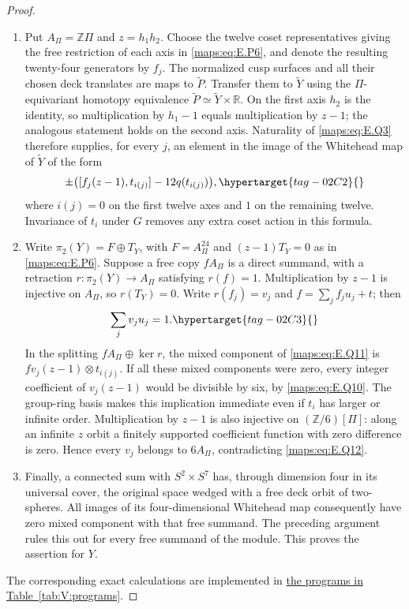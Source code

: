 \documentclass[11pt,a4paper]{article}
\numberwithin{equation}{section}
\theoremstyle{definition}
\begin{document}
\begin{proof}
\begin{enumerate}[label=\arabic*.,leftmargin=*]
\item Put $A_\Pi=\mathbb Z\Pi$ and $z=h_1h_2$.  Choose the twelve
coset representatives giving the free restriction of each
axis in \eqref{maps:eq:E.P6}, and denote the resulting twenty-four generators
by $f_j$.  The normalized cusp surfaces and all their chosen
deck translates are maps to $\widetilde P$.  Transfer
them to $\widetilde Y$ using the $\Pi$-equivariant homotopy
equivalence $\widetilde P\simeq\widetilde Y\times\mathbb R$.
On the first axis $h_2$ is the identity, so multiplication
by $h_1-1$ equals multiplication by $z-1$; the analogous
statement holds on the second axis.  Naturality of \eqref{maps:eq:E.Q3}
therefore supplies, for every $j$, an element in the image
of the Whitehead map of $\widetilde Y$ of the form
\begin{equation}
 \pm\bigl([f_j(z-1),t_{i(j)}]-12q(t_{i(j)})\bigr),
 \hypertarget{tag-02C2}{}\label{maps:eq:E.Q11}
\end{equation}
where $i(j)=0$ on the first twelve axes and $1$ on the
remaining twelve.  Invariance of $t_i$ under $G$ removes
any extra coset action in this formula.

\item Write $\pi_2(Y)=F\oplus T_Y$, with $F=A_\Pi^{24}$ and
$(z-1)T_Y=0$ as in \eqref{maps:eq:E.P6}.  Suppose a free copy $fA_\Pi$
is a direct summand, with a retraction $r:\pi_2(Y)\to A_\Pi$
satisfying $r(f)=1$.  Multiplication by $z-1$ is injective
on $A_\Pi$, so $r(T_Y)=0$.  Write $r(f_j)=v_j$ and
$f=\sum_j f_j u_j+t$; then
\begin{equation}
                         \sum_j v_j u_j=1.
 \hypertarget{tag-02C3}{}\label{maps:eq:E.Q12}
\end{equation}
In the splitting $fA_\Pi\oplus\ker r$, the mixed component
of \eqref{maps:eq:E.Q11} is $f v_j(z-1)\otimes t_{i(j)}$.  If all these
mixed components were zero, every integer coefficient of
$v_j(z-1)$ would be divisible by six, by \eqref{maps:eq:E.Q10}.  The
group-ring basis makes this implication immediate even if
$t_i$ has larger or infinite order.  Multiplication by
$z-1$ is also injective on $(\mathbb Z/6)[\Pi]$: along an
infinite $z$ orbit a finitely supported coefficient function
with zero difference is zero.  Hence every $v_j$ belongs
to $6A_\Pi$, contradicting \eqref{maps:eq:E.Q12}.

\item Finally, a connected sum with $S^2\times S^7$ has, through
dimension four in its universal cover, the original space
wedged with a free deck orbit of two-spheres.  All images
of its four-dimensional Whitehead map consequently have
zero mixed component with that free summand.  The preceding
argument rules this out for every free summand of the module.  This proves the assertion for $Y$.
\end{enumerate}
The corresponding exact calculations are implemented in \hyperlink{prog:V:quadratic}{the programs in Table~\ref*{tab:V:programs}}.
\end{proof}
\end{document}
